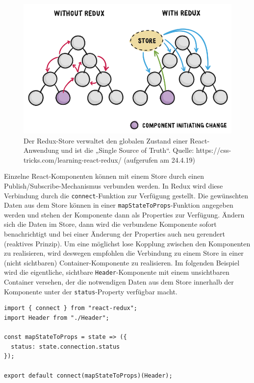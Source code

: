 \begin{figure}[H]
    \includegraphics[width=12cm]{chapter/entwurf/bilder/BA_redux.png}
    \centering
    \caption{Der Redux-Store verwaltet den globalen Zustand einer React-Anwendung und ist die „Single Source of Truth“. Quelle: https://css-tricks.com/learning-react-redux/ (aufgerufen am 24.4.19)}
    \label{abb:redux_flow}
\end{figure}


Einzelne React-Komponenten können mit einem Store durch einen Publish/Subscribe-Mechanismus verbunden werden. In Redux wird diese Verbindung durch die \texttt{connect}-Funktion zur Verfügung gestellt. Die gewünschten Daten aus dem Store können in einer \texttt{mapStateToProps}-Funktion angegeben werden und stehen der Komponente dann als Properties zur Verfügung. Ändern sich die Daten im Store, dann wird die verbundene Komponente sofort benachrichtigt und bei einer Änderung der Properties auch neu gerendert (reaktives Prinzip). Um eine möglichst lose Kopplung zwischen den Komponenten zu realisieren, wird deswegen empfohlen die Verbindung zu einem Store in einer (nicht sichtbaren) Container-Komponente zu realisieren. Im folgenden Beispiel wird die eigentliche, sichtbare \texttt{Header}-Komponente mit einem unsichtbaren Container versehen, der die notwendigen Daten aus dem Store innerhalb der Komponente unter der \texttt{status}-Property verfügbar macht.

\begin{minipage}{\linewidth}
\begin{lstlisting}[caption={Über den connect-Aufruf beim Exportieren der Komponente wird sie mit dem Store verbunden. (aus:  src/client/components/ClientHeaderContainer.js)}]
import { connect } from "react-redux";
import Header from "./Header";

const mapStateToProps = state => ({
  status: state.connection.status
});

export default connect(mapStateToProps)(Header);
\end{lstlisting}
\end{minipage}

